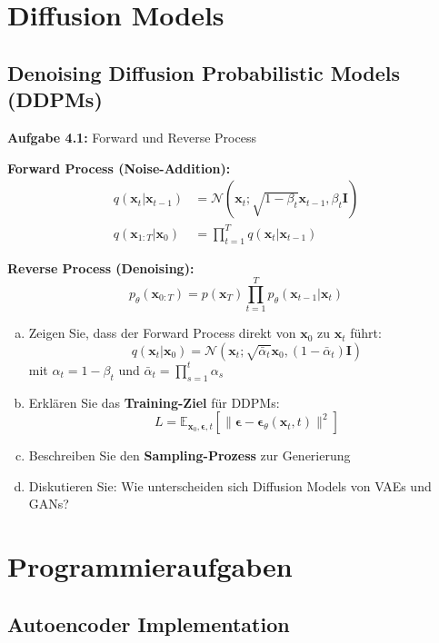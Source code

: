 \documentclass[12pt,a4paper]{article}
\begin{document}
\section{Diffusion Models}

\subsection{Denoising Diffusion Probabilistic Models (DDPMs)}

\textbf{Aufgabe 4.1:} Forward und Reverse Process

\textbf{Forward Process (Noise-Addition):}
\begin{align}
q(\mathbf{x}_t|\mathbf{x}_{t-1}) &= \mathcal{N}(\mathbf{x}_t; \sqrt{1-\beta_t}\mathbf{x}_{t-1}, \beta_t \mathbf{I}) \\
q(\mathbf{x}_{1:T}|\mathbf{x}_0) &= \prod_{t=1}^T q(\mathbf{x}_t|\mathbf{x}_{t-1})
\end{align}

\textbf{Reverse Process (Denoising):}
\begin{equation}
p_\theta(\mathbf{x}_{0:T}) = p(\mathbf{x}_T) \prod_{t=1}^T p_\theta(\mathbf{x}_{t-1}|\mathbf{x}_t)
\end{equation}

\begin{enumerate}[(a)]
    \item Zeigen Sie, dass der Forward Process direkt von $\mathbf{x}_0$ zu $\mathbf{x}_t$ führt:
    $$q(\mathbf{x}_t|\mathbf{x}_0) = \mathcal{N}(\mathbf{x}_t; \sqrt{\bar{\alpha}_t}\mathbf{x}_0, (1-\bar{\alpha}_t)\mathbf{I})$$
    mit $\alpha_t = 1 - \beta_t$ und $\bar{\alpha}_t = \prod_{s=1}^t \alpha_s$
    \item Erklären Sie das \textbf{Training-Ziel} für DDPMs:
    $$L = \mathbb{E}_{\mathbf{x}_0, \boldsymbol{\epsilon}, t}[\|\boldsymbol{\epsilon} - \boldsymbol{\epsilon}_\theta(\mathbf{x}_t, t)\|^2]$$
    \item Beschreiben Sie den \textbf{Sampling-Prozess} zur Generierung
    \item Diskutieren Sie: Wie unterscheiden sich Diffusion Models von VAEs und GANs?
\end{enumerate}

\section{Programmieraufgaben}

\subsection{Autoencoder Implementation}
\end{document}
